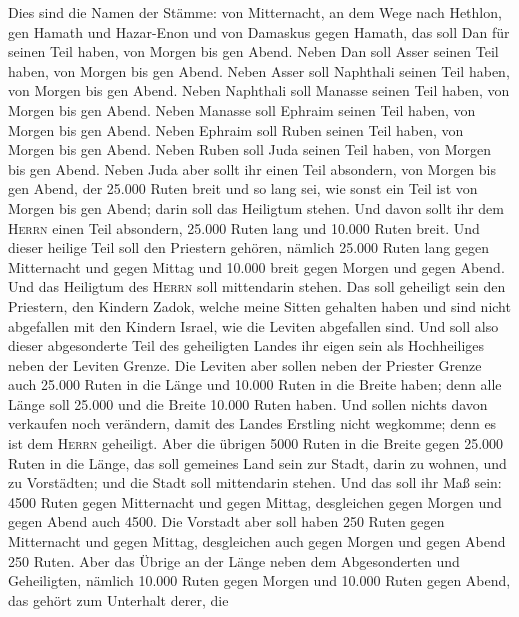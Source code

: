  Dies sind die Namen der Stämme: von Mitternacht, an dem
Wege nach Hethlon, gen Hamath und Hazar-Enon und von Damaskus gegen
Hamath, das soll Dan für seinen Teil haben, von Morgen bis gen Abend.
 Neben Dan soll Asser seinen Teil haben, von Morgen bis
gen Abend.  Neben Asser soll Naphthali seinen Teil haben,
von Morgen bis gen Abend.  Neben Naphthali soll Manasse
seinen Teil haben, von Morgen bis gen Abend.  Neben
Manasse soll Ephraim seinen Teil haben, von Morgen bis gen Abend.
 Neben Ephraim soll Ruben seinen Teil haben, von Morgen
bis gen Abend.  Neben Ruben soll Juda seinen Teil haben,
von Morgen bis gen Abend.  Neben Juda aber sollt ihr einen
Teil absondern, von Morgen bis gen Abend, der 25.000 Ruten breit und so
lang sei, wie sonst ein Teil ist von Morgen bis gen Abend; darin soll
das Heiligtum stehen.  Und davon sollt ihr dem
\textsc{Herrn} einen Teil absondern, 25.000 Ruten lang und 10.000 Ruten
breit.  Und dieser heilige Teil soll den Priestern
gehören, nämlich 25.000 Ruten lang gegen Mitternacht und gegen Mittag
und 10.000 breit gegen Morgen und gegen Abend. Und das Heiligtum des
\textsc{Herrn} soll mittendarin stehen.  Das soll
geheiligt sein den Priestern, den Kindern Zadok, welche meine Sitten
gehalten haben und sind nicht abgefallen mit den Kindern Israel, wie die
Leviten abgefallen sind.  Und soll also dieser
abgesonderte Teil des geheiligten Landes ihr eigen sein als Hochheiliges
neben der Leviten Grenze.  Die Leviten aber sollen neben
der Priester Grenze auch 25.000 Ruten in die Länge und 10.000 Ruten in
die Breite haben; denn alle Länge soll 25.000 und die Breite 10.000
Ruten haben.  Und sollen nichts davon verkaufen noch
verändern, damit des Landes Erstling nicht wegkomme; denn es ist dem
\textsc{Herrn} geheiligt.  Aber die übrigen 5000 Ruten in
die Breite gegen 25.000 Ruten in die Länge, das soll gemeines Land sein
zur Stadt, darin zu wohnen, und zu Vorstädten; und die Stadt soll
mittendarin stehen.  Und das soll ihr Maß sein: 4500
Ruten gegen Mitternacht und gegen Mittag, desgleichen gegen Morgen und
gegen Abend auch 4500.  Die Vorstadt aber soll haben 250
Ruten gegen Mitternacht und gegen Mittag, desgleichen auch gegen Morgen
und gegen Abend 250 Ruten.  Aber das Übrige an der Länge
neben dem Abgesonderten und Geheiligten, nämlich 10.000 Ruten gegen
Morgen und 10.000 Ruten gegen Abend, das gehört zum Unterhalt derer, die
